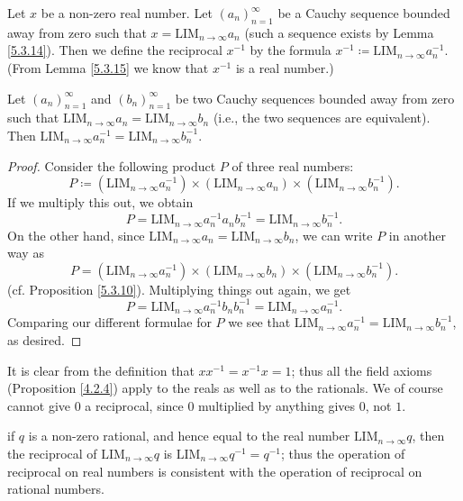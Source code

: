 \begin{definition}\label{5.3.16}
Let \(x\) be a non-zero real number.
Let \((a_n)_{n = 1}^{\infty}\) be a Cauchy sequence bounded away from zero such that \(x = \text{LIM}_{n \to \infty} a_n\) (such a sequence exists by Lemma \ref{5.3.14}).
Then we define the reciprocal \(x^{-1}\) by the formula \(x^{-1} \coloneqq \text{LIM}_{n \to \infty} a_n^{-1}\).
(From Lemma \ref{5.3.15} we know that \(x^{-1}\) is a real number.)
\end{definition}

\begin{lemma}\label{5.3.17}
Let \((a_n)_{n = 1}^{\infty}\) and \((b_n)_{n = 1}^{\infty}\) be two Cauchy sequences bounded away from zero such that \(\text{LIM}_{n \to \infty} a_n = \text{LIM}_{n \to \infty} b_n\) (i.e., the two sequences are equivalent).
Then \(\text{LIM}_{n \to \infty} a_n^{-1} = \text{LIM}_{n \to \infty} b_n^{-1}\).
\end{lemma}

\begin{proof}
Consider the following product \(P\) of three real numbers:
\[
    P \coloneqq (\text{LIM}_{n \to \infty} a_n^{-1}) \times (\text{LIM}_{n \to \infty} a_n) \times (\text{LIM}_{n \to \infty} b_n^{-1}).
\]
If we multiply this out, we obtain
\[
    P = \text{LIM}_{n \to \infty} a_n^{-1} a_n b_n^{-1} = \text{LIM}_{n \to \infty} b_n^{-1}.
\]
On the other hand, since \(\text{LIM}_{n \to \infty} a_n = \text{LIM}_{n \to \infty} b_n\), we can write \(P\) in another way as
\[
    P = (\text{LIM}_{n \to \infty} a_n^{-1}) \times (\text{LIM}_{n \to \infty} b_n) \times (\text{LIM}_{n \to \infty} b_n^{-1}).
\]
(cf. Proposition \ref{5.3.10}).
Multiplying things out again, we get
\[
    P = \text{LIM}_{n \to \infty} a_n^{-1} b_n b_n^{-1} = \text{LIM}_{n \to \infty} a_n^{-1}.
\]
Comparing our different formulae for \(P\) we see that \(\text{LIM}_{n \to \infty} a_n^{-1} = \text{LIM}_{n \to \infty} b_n^{-1}\), as desired.
\end{proof}

\begin{note}
It is clear from the definition that \(xx^{-1} = x^{-1}x = 1\);
thus all the field axioms (Proposition \ref{4.2.4}) apply to the reals as well as to the rationals.
We of course cannot give \(0\) a reciprocal, since \(0\) multiplied by anything gives \(0\), not \(1\).
\end{note}

\begin{note}
if \(q\) is a non-zero rational, and hence equal to the real number \(\text{LIM}_{n \to \infty} q\), then the reciprocal of \(\text{LIM}_{n \to \infty} q\) is \(\text{LIM}_{n \to \infty} q^{-1} = q^{-1}\);
thus the operation of reciprocal on real numbers is consistent with the operation of reciprocal on rational numbers.
\end{note}

